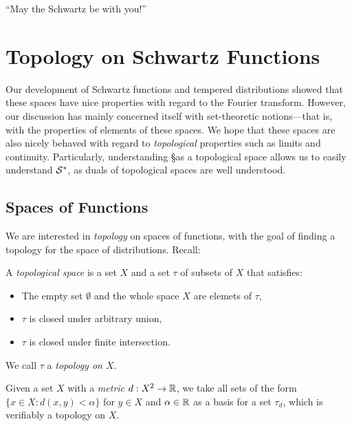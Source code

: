 
  \begin{savequote}
    ``May the Schwartz be with you!''
  \end{savequote}
  \chapter{Topology on Schwartz Functions}
    \label{ch:topons}
    Our development of Schwartz functions and tempered distributions showed that these spaces have nice properties with regard to the Fourier transform.
    However, our discussion has mainly concerned itself with set-theoretic notions---that is, with the properties of elements of these spaces.
    We hope that these spaces are also nicely behaved with regard to \emph{topological} properties such as limits and continuity.
    Particularly, understanding \S as a topological space allows us to easily understand $\S^*$, as duals of topological spaces are well understood.

    \section{Spaces of Functions}
      \label{sec:spcoffunc}
      We are interested in \emph{topology} on spaces of functions, with the goal of finding a topology for the space of distributions.
      Recall:
      \begin{defn}
        A \emph{topological space} is a set $X$ and a set $\tau$ of subsets of $X$ that satisfies:
        \begin{itemize}
          \item The empty set $\emptyset$ and the whole space $X$ are elemets of $\tau$,
          \item $\tau$ is closed under arbitrary union,
          \item $\tau$ is closed under finite intersection.
        \end{itemize}
        We call $\tau$ a \emph{topology on $X$}.

        Given a set $X$ with a \emph{metric} $d:X^2\rightarrow\R$, we take all sets of the form $\{x\in X:d(x,y)<\alpha\}$ for $y\in X$ and $\alpha\in\R$ as a basis for a set $\tau_d$, which is verifiably a topology on $X$.
      \end{defn}

